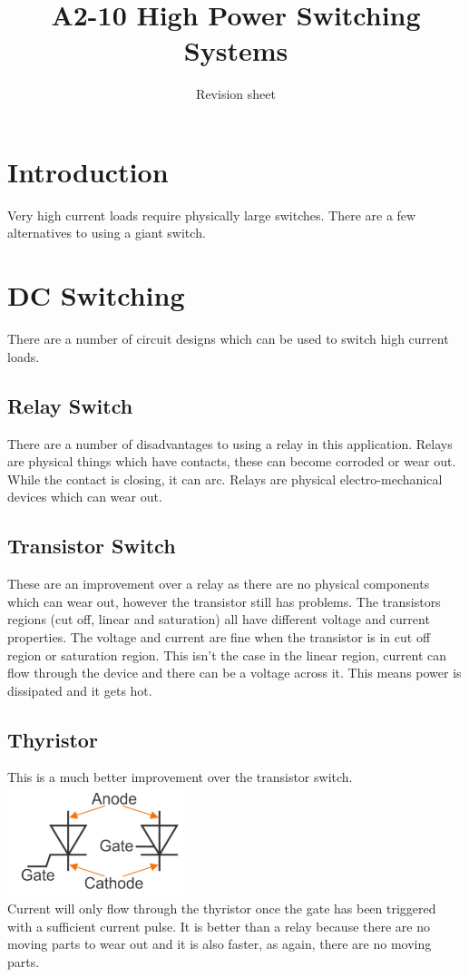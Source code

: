 \documentclass[a4paper, 11pt, twocolumn]{article}
\title{A2-10 High Power Switching Systems}
\author{Revision sheet}
\date{}
\begin{document}
    \maketitle

    \section{Introduction}
    \thispagestyle{fancy}
    Very high current loads require physically large switches. There are a few alternatives to using a giant switch.

    \section{DC Switching}
    There are a number of circuit designs which can be used to switch high current loads.
    \subsection{Relay Switch}
    There are a number of disadvantages to using a relay in this application. Relays are physical things which have contacts, these can become corroded or wear out. While the contact is closing, it can arc. Relays are physical electro-mechanical devices which can wear out.
    \subsection{Transistor Switch}
    These are an improvement over a relay as there are no physical components which can wear out, however the transistor still has problems. The transistors regions (cut off, linear and saturation) all have different voltage and current properties. The voltage and current are fine when the transistor is in cut off region or saturation region. This isn't the case in the linear region, current can flow through the device and there can be a voltage across it. This means power is dissipated and it gets hot.
    \subsection{Thyristor}
    This is a much better improvement over the transistor switch. \\
    \includegraphics[width=0.4\textwidth]{thyristor.jpg}\\
    Current will only flow through the thyristor once the gate has been triggered with a sufficient current pulse. It is better than a relay because there are no moving parts to wear out and it is also faster, as again, there are no moving parts.
\end{document}

